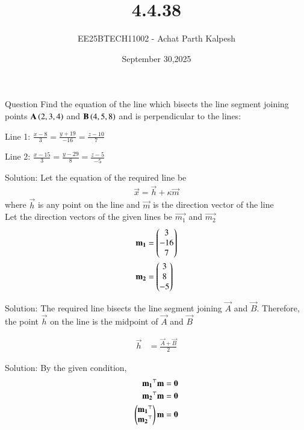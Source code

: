 \documentclass{beamer}
\title %
{4.4.38}
\date{September 30,2025}
\author %
{EE25BTECH11002 - Achat Parth Kalpesh}
\begin{document}
\frame{\titlepage}

\begin{frame}{Question}
  Find the equation of the line which bisects the line segment joining points $\mathbf{A}\left(2,3,4\right)$ and $\mathbf{B}\left(4,5,8\right)$ and is perpendicular to the lines:
  
  \vspace{1em}
  
  Line 1: $\frac{x-8}{3} = \frac{y+19}{-16} = \frac{z-10}{7}$
  
  \vspace{1em}
  
  Line 2: $\frac{x-15}{3} = \frac{y-29}{8} = \frac{z-5}{-5}$
\end{frame}

\begin{frame}{Solution:}
Let the equation of the required line be 
\begin{align}
    \vec{x} = \vec{h} + \kappa \vec{m}
\end{align}
where $\vec{h}$ is any point on the line and
$\vec{m}$ is the direction vector of the line\\
Let the direction vectors of the given lines be $\vec{m_1}$ and  $\vec{m_2}$  
\begin{align}
    \mathbf{m_1} &= \begin{pmatrix}3\\-16\\7\end{pmatrix} \\
    \mathbf{m_2} &= \begin{pmatrix}3\\8\\-5\end{pmatrix}
\end{align}
\end{frame}

\begin{frame}{Solution:}
  The required line bisects the line segment joining $\vec{A}$ and $\vec{B}$. Therefore, the point $\vec{h}$ on the line is the midpoint of $\vec{A}$ and $\vec{B}$
  
  \begin{align}
    \vec{h} &= \frac{\vec{A} + \vec{B}}{2}
  \end{align}
\end{frame}

\begin{frame}{Solution:}
By the given condition,
\begin{align}
    \mathbf{m_1}^\top\mathbf{m} &= \mathbf{0}\\
    \mathbf{m_2}^\top\mathbf{m} &= \mathbf{0}\\
    \begin{pmatrix}\mathbf{m_1}^\top \\ \mathbf{m_2}^\top\end{pmatrix} \mathbf{m} &= \mathbf{0}
\end{align}
\end{frame}
\end{document}
